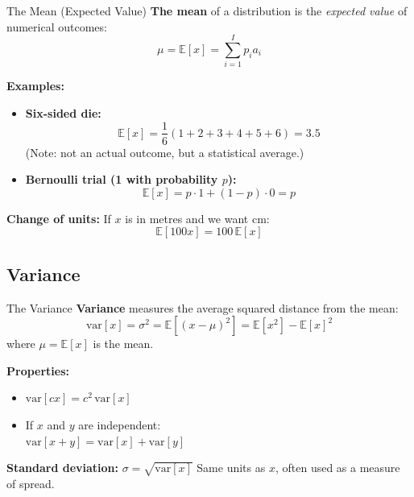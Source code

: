 \documentclass{beamer}
\begin{document}
\begin{frame}{The Mean (Expected Value)}
\textbf{The mean} of a distribution is the \textit{expected value} of numerical outcomes:
\[
\mu = \mathbb{E}[x] = \sum_{i=1}^{I} p_i a_i
\]

\vspace{1em}
\textbf{Examples:}
\begin{itemize}
  \item \textbf{Six-sided die:}
  \[
  \mathbb{E}[x] = \frac{1}{6}(1 + 2 + 3 + 4 + 5 + 6) = 3.5
  \]
  (Note: not an actual outcome, but a statistical average.)

  \item \textbf{Bernoulli trial (1 with probability $p$):}
  \[
  \mathbb{E}[x] = p \cdot 1 + (1 - p) \cdot 0 = p
  \]
\end{itemize}

\vspace{1em}
\textbf{Change of units:} If $x$ is in metres and we want cm:
\[
\mathbb{E}[100x] = 100 \, \mathbb{E}[x]
\]
\end{frame}


\subsection{Variance}
\begin{frame}{The Variance}
\textbf{Variance} measures the average squared distance from the mean:
\[
\text{var}[x] = \sigma^2 = \mathbb{E}\left[(x - \mu)^2\right] = \mathbb{E}[x^2] - \mathbb{E}[x]^2
\]
where $\mu = \mathbb{E}[x]$ is the mean.

\vspace{1em}
\textbf{Properties:}
\begin{itemize}
  \item $\text{var}[cx] = c^2 \, \text{var}[x]$
  \item If $x$ and $y$ are independent: \\
    $\text{var}[x + y] = \text{var}[x] + \text{var}[y]$
\end{itemize}

\vspace{0.5em}
\textbf{Standard deviation:} $\sigma = \sqrt{\text{var}[x]}$
Same units as $x$, often used as a measure of spread.
\end{frame}
\end{document}
